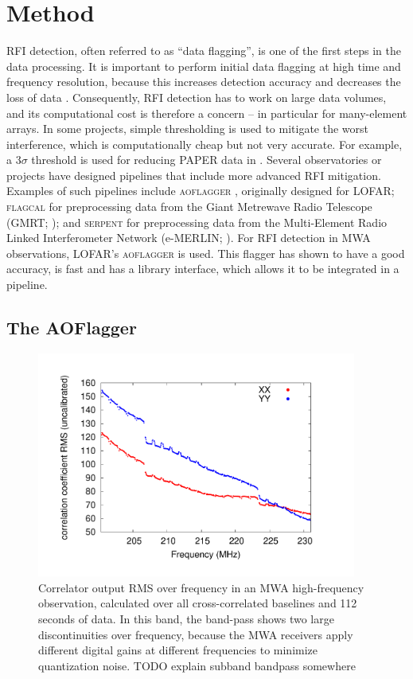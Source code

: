\documentclass[useAMS,usenatbib]{mn2e}
\begin{document}
\section{Method}
RFI detection, often referred to as ``data flagging'', is one of the first steps in the data processing. It is important to perform initial data flagging at high time and frequency resolution, because this increases detection accuracy and decreases the loss of data \citep{lofar-radio-environment}. Consequently, RFI detection has to work on large data volumes, and its computational cost is therefore a concern -- in particular for many-element arrays. In some projects, simple thresholding is used to mitigate the worst interference, which is computationally cheap but not very accurate. For example, a $3\sigma$ threshold is used for reducing PAPER data in \citet{parsons-paper-eorlimit-2014}. Several observatories or projects have designed pipelines that include more advanced RFI mitigation. Examples of such pipelines include \textsc{aoflagger} \citep{post-correlation-rfi-classification,scale-invariant-rank-operator}, originally designed for LOFAR; \textsc{flagcal} for preprocessing data from the Giant Metrewave Radio Telescope (GMRT; \citealt{prasad-flagcal-2012}); and \textsc{serpent} for preprocessing data from the Multi-Element Radio Linked Interferometer Network (e-MERLIN; \citealt{serpent-peck-2013}). For RFI detection in MWA observations, LOFAR's \textsc{aoflagger} is used. This flagger has shown to have a good accuracy, is fast and has a library interface, which allows it to be integrated in a pipeline.

\subsection{The AOFlagger}

\begin{figure}
\begin{center}\hspace*{-0.8cm}\includegraphics[width=10.5cm]{img/bandpass}
\caption{Correlator output RMS over frequency in an MWA high-frequency observation, calculated over all cross-correlated baselines and 112 seconds of data. In this band, the band-pass shows two large discontinuities over frequency, because the MWA receivers apply different digital gains at different frequencies to minimize quantization noise. TODO explain subband bandpass somewhere %
}
\label{fig:bandpass}
\end{center}
\end{figure}
\end{document}

